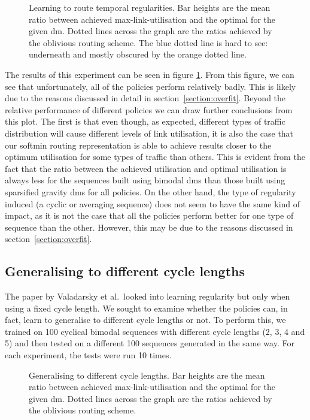 \begin{figure}
    \centering
    
    \caption{Learning to route temporal regularities. Bar heights are the mean ratio between achieved max-link-utilisation and the optimal for the given \ac{dm}. Dotted lines across the graph are the ratios achieved by the oblivious routing scheme. The blue dotted line is hard to see: underneath and mostly obscured by the orange dotted line.}
    \label{fig:exp_cyclic}
\end{figure}

The results of this experiment can be seen in figure \ref{fig:exp_cyclic}. From this figure, we can see that unfortunately, all of the policies perform relatively badly. This is likely due to the reasons discussed in detail in section~\ref{section:overfit}. Beyond the relative performance of different policies we can draw further conclusions from this plot. The first is that even though, as expected, different types of traffic distribution will cause different levels of link utilisation, it is also the case that our softmin routing representation is able to achieve results closer to the optimum utilisation for some types of traffic than others. This is evident from the fact that the ratio between the achieved utilisation and optimal utilisation is always less for the sequences built using bimodal \acp{dm} than those built using sparsified gravity \acp{dm} for all policies. On the other hand, the type of regularity induced (a cyclic or averaging sequence) does not seem to have the same kind of impact, as it is not the case that all the policies perform better for one type of sequence than the other. However, this may be due to the reasons discussed in section~\ref{section:overfit}.

\subsection{Generalising to different cycle lengths}
The paper by Valadarsky et al.\ looked into learning regularity but only when using a fixed cycle length. We sought to examine whether the policies can, in fact, learn to generalise to different cycle lengths or not. To perform this, we trained on 100 cyclical bimodal sequences with different cycle lengths (2, 3, 4 and 5) and then tested on a different 100 sequences generated in the same way. For each experiment, the tests were run 10 times.

\begin{figure}
    \centering
    
    \caption{Generalising to different cycle lengths. Bar heights are the mean ratio between achieved max-link-utilisation and the optimal for the given \ac{dm}. Dotted lines across the graph are the ratios achieved by the oblivious routing scheme.}
    \label{fig:exp_vary}
\end{figure}

